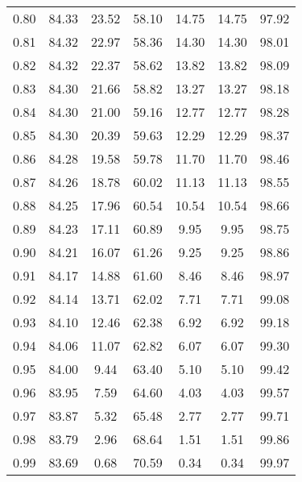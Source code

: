 \begin{tabular}{|c|c|c|c|c|c|c|}
      0.80 &     84.33 &     23.52 &      58.10 &   14.75 &      14.75 &         97.92 \\
      0.81 &     84.32 &     22.97 &      58.36 &   14.30 &      14.30 &         98.01 \\
      0.82 &     84.32 &     22.37 &      58.62 &   13.82 &      13.82 &         98.09 \\
      0.83 &     84.30 &     21.66 &      58.82 &   13.27 &      13.27 &         98.18 \\
      0.84 &     84.30 &     21.00 &      59.16 &   12.77 &      12.77 &         98.28 \\
      0.85 &     84.30 &     20.39 &      59.63 &   12.29 &      12.29 &         98.37 \\
      0.86 &     84.28 &     19.58 &      59.78 &   11.70 &      11.70 &         98.46 \\
      0.87 &     84.26 &     18.78 &      60.02 &   11.13 &      11.13 &         98.55 \\
      0.88 &     84.25 &     17.96 &      60.54 &   10.54 &      10.54 &         98.66 \\
      0.89 &     84.23 &     17.11 &      60.89 &    9.95 &       9.95 &         98.75 \\
      0.90 &     84.21 &     16.07 &      61.26 &    9.25 &       9.25 &         98.86 \\
      0.91 &     84.17 &     14.88 &      61.60 &    8.46 &       8.46 &         98.97 \\
      0.92 &     84.14 &     13.71 &      62.02 &    7.71 &       7.71 &         99.08 \\
      0.93 &     84.10 &     12.46 &      62.38 &    6.92 &       6.92 &         99.18 \\
      0.94 &     84.06 &     11.07 &      62.82 &    6.07 &       6.07 &         99.30 \\
      0.95 &     84.00 &      9.44 &      63.40 &    5.10 &       5.10 &         99.42 \\
      0.96 &     83.95 &      7.59 &      64.60 &    4.03 &       4.03 &         99.57 \\
      0.97 &     83.87 &      5.32 &      65.48 &    2.77 &       2.77 &         99.71 \\
      0.98 &     83.79 &      2.96 &      68.64 &    1.51 &       1.51 &         99.86 \\
      0.99 &     83.69 &      0.68 &      70.59 &    0.34 &       0.34 &         99.97 \\
\bottomrule
\end{tabular}
